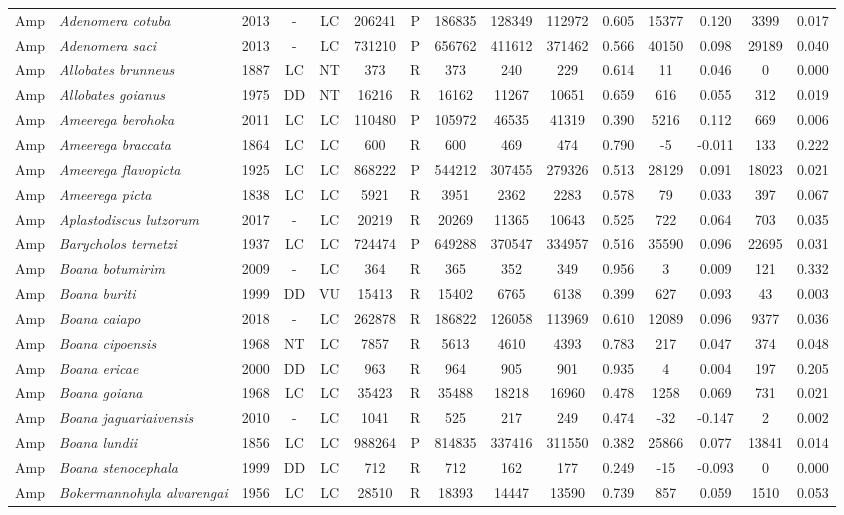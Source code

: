 \documentclass[12pt,openright,oneside,a4paper,english]{abntex2}
\begin{document}
\begin{landscape}
\begin{longtable}{llccccccccccccc}
		Amp&\textit{Adenomera cotuba}&2013&-&LC&206241&P&186835&128349&112972&0.605&15377&0.120&3399&0.017\\
		Amp&\textit{Adenomera saci}&2013&-&LC&731210&P&656762&411612&371462&0.566&40150&0.098&29189&0.040\\
		Amp&\textit{Allobates brunneus}&1887&LC&NT&373&R&373&240&229&0.614&11&0.046&0&0.000\\
		Amp&\textit{Allobates goianus}&1975&DD&NT&16216&R&16162&11267&10651&0.659&616&0.055&312&0.019\\
		Amp&\textit{Ameerega berohoka}&2011&LC&LC&110480&P&105972&46535&41319&0.390&5216&0.112&669&0.006\\
		Amp&\textit{Ameerega braccata}&1864&LC&LC&600&R&600&469&474&0.790&-5&-0.011&133&0.222\\
		Amp&\textit{Ameerega flavopicta}&1925&LC&LC&868222&P&544212&307455&279326&0.513&28129&0.091&18023&0.021\\
		Amp&\textit{Ameerega picta}&1838&LC&LC&5921&R&3951&2362&2283&0.578&79&0.033&397&0.067\\
		Amp&\textit{Aplastodiscus lutzorum}&2017&-&LC&20219&R&20269&11365&10643&0.525&722&0.064&703&0.035\\
		Amp&\textit{Barycholos ternetzi}&1937&LC&LC&724474&P&649288&370547&334957&0.516&35590&0.096&22695&0.031\\
		Amp&\textit{Boana botumirim}&2009&-&LC&364&R&365&352&349&0.956&3&0.009&121&0.332\\
		Amp&\textit{Boana buriti}&1999&DD&VU&15413&R&15402&6765&6138&0.399&627&0.093&43&0.003\\
		Amp&\textit{Boana caiapo}&2018&-&LC&262878&R&186822&126058&113969&0.610&12089&0.096&9377&0.036\\
		Amp&\textit{Boana cipoensis}&1968&NT&LC&7857&R&5613&4610&4393&0.783&217&0.047&374&0.048\\
		Amp&\textit{Boana ericae}&2000&DD&LC&963&R&964&905&901&0.935&4&0.004&197&0.205\\
		Amp&\textit{Boana goiana}&1968&LC&LC&35423&R&35488&18218&16960&0.478&1258&0.069&731&0.021\\
		Amp&\textit{Boana jaguariaivensis}&2010&-&LC&1041&R&525&217&249&0.474&-32&-0.147&2&0.002\\
		Amp&\textit{Boana lundii}&1856&LC&LC&988264&P&814835&337416&311550&0.382&25866&0.077&13841&0.014\\
		Amp&\textit{Boana stenocephala}&1999&DD&LC&712&R&712&162&177&0.249&-15&-0.093&0&0.000\\
		Amp&\textit{Bokermannohyla alvarengai}&1956&LC&LC&28510&R&18393&14447&13590&0.739&857&0.059&1510&0.053\\

\end{longtable}
\end{landscape}
\end{document}
